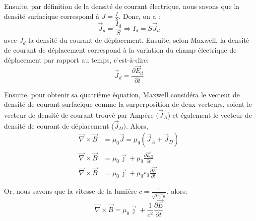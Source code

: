 \documentclass[12pt]{article}
\begin{document}
\noindent Ensuite, par définition de la densité de courant électrique, nous savons que la densité surfacique correspond à $J = \frac{I}{S}$. Donc, on a :
$$\vec{J}_d = \frac{I_d}{S} \Rightarrow I_d = S\vec{J}_d$$ avec $J_d$ la densité du courant de déplacement. Ensuite, selon Maxwell, la densité de courant de déplacement correspond à la variation du champ électrique de déplacement par rapport au temps, c'est-à-dire: $$\vec{J}_d = \frac{\partial \vec{E}_d}{\partial t}$$ 

\noindent Ensuite, pour obtenir sa quatrième équation, Maxwell considéra le vecteur de densité de courant surfacique comme la surperposition de deux vecteurs, soient le vecteur de densité de courant trouvé par Ampère ($\vec{J}_A$) et également le vecteur de densité de courant de déplacement ($\vec{J}_D)$. Alors,
\begin{align*}
\vec{\nabla} \times \vec{B} &= \mu_0\vec{J}=\mu_0(\vec{J}_A+\vec{J}_D)
\\\vec{\nabla} \times \vec{B} &= \mu_0\vec{\jmath}+\mu_0\frac{\partial \vec{E}_D}{\partial t}
\\\vec{\nabla} \times \vec{B} &= \mu_0\vec{\jmath} + \mu_0\varepsilon_0\frac{\partial \vec{E}}{\partial t}
\end{align*}

\noindent Or, nous savons que la vitesse de la lumière $c = \frac{1}{\sqrt{\mu_0 \varepsilon_0}}$, alors: $$\vec{\nabla} \times \vec{B} = \mu_0\vec{\jmath} + \frac{1}{c^2} \frac{\partial \vec{E}}{\partial t}$$



\end{document}
